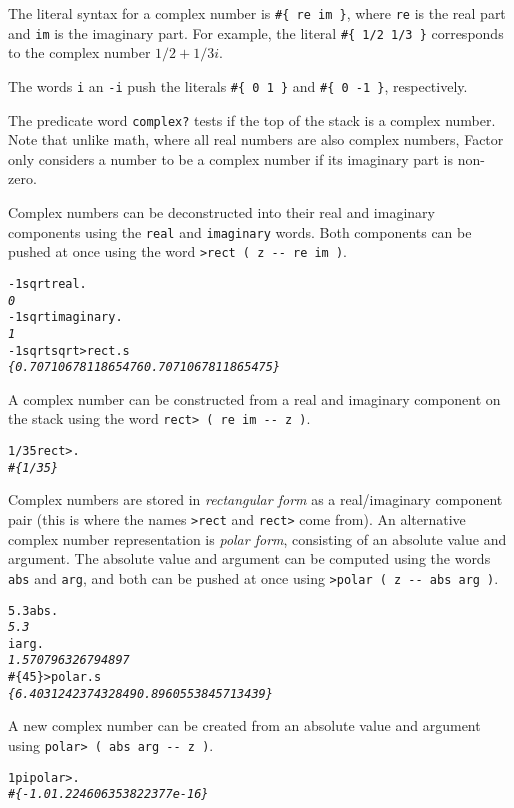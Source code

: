\documentclass[english]{article}
\begin{document}
The literal syntax for a complex number is \texttt{\#\{ re im \}}, where \texttt{re} is the real part and \texttt{im} is the imaginary part. For example, the literal \texttt{\#\{ 1/2 1/3 \}} corresponds to the complex number $1/2 + 1/3i$.

The words \texttt{i} an \texttt{-i} push the literals \texttt{\#\{ 0 1 \}} and \texttt{\#\{ 0 -1 \}}, respectively.

The predicate word \texttt{complex?} tests if the top of the stack is a complex number. Note that unlike math, where all real numbers are also complex numbers, Factor only considers a number to be a complex number if its imaginary part is non-zero.

Complex numbers can be deconstructed into their real and imaginary components using the \texttt{real} and \texttt{imaginary} words. Both components can be pushed at once using the word \texttt{>rect ( z -{}- re im )}.

\begin{alltt}
-1 sqrt real .
\emph{0}
-1 sqrt imaginary .
\emph{1}
-1 sqrt sqrt >rect .s
\emph{\{ 0.7071067811865476 0.7071067811865475 \}}
\end{alltt}

A complex number can be constructed from a real and imaginary component on the stack using the word \texttt{rect> ( re im -{}- z )}.

\begin{alltt}
1/3 5 rect> .
\emph{\#\{ 1/3 5 \}}
\end{alltt}

Complex numbers are stored in \emph{rectangular form} as a real/imaginary component pair (this is where the names \texttt{>rect} and \texttt{rect>} come from). An alternative complex number representation is \emph{polar form}, consisting of an absolute value and argument. The absolute value and argument can be computed using the words \texttt{abs} and \texttt{arg}, and both can be pushed at once using \texttt{>polar ( z -{}- abs arg )}.

\begin{alltt}
5.3 abs .
\emph{5.3}
i arg .
\emph{1.570796326794897}
\#\{ 4 5 \} >polar .s
\emph{\{ 6.403124237432849 0.8960553845713439 \}}
\end{alltt}

A new complex number can be created from an absolute value and argument using \texttt{polar> ( abs arg -{}- z )}.

\begin{alltt}
1 pi polar> .
\emph{\#\{ -1.0 1.224606353822377e-16 \}}
\end{alltt}
\end{document}
